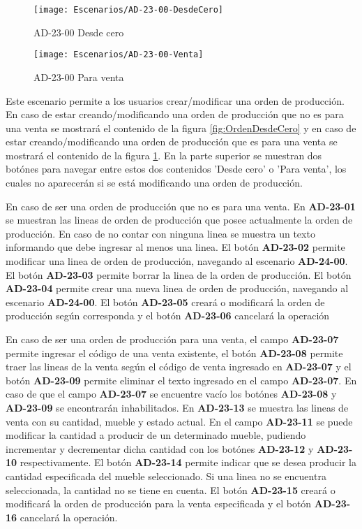 \begin{figure}[H]
    \centering
    \begin{minipage}[b]{0.4\textwidth}
        \texttt{[image: Escenarios/AD-23-00-DesdeCero]}
        \caption{AD-23-00 Desde cero}
        \label{fig:OrdenDesdeCero}
    \end{minipage}
    \hfill
    \begin{minipage}[b]{0.4\textwidth}
        \texttt{[image: Escenarios/AD-23-00-Venta]}
        \caption{AD-23-00 Para venta}
        \label{fig:OrdenParaVenta}
    \end{minipage}
    \end{figure}

Este escenario permite a los usuarios crear/modificar una orden de producción. En caso de estar creando/modificando una orden de producción que no es para una venta se mostrará el contenido de la figura \ref{fig:OrdenDesdeCero} y en caso de estar creando/modificando una orden de producción que es para una venta se mostrará el contenido de la figura \ref{fig:OrdenParaVenta}. En la parte superior se muestran dos botónes para navegar entre estos dos contenidos 'Desde cero' o 'Para venta', los cuales no aparecerán si se está modificando una orden de producción. 

En caso de ser una orden de producción que no es para una venta. En \textbf{AD-23-01} se muestran las lineas de orden de producción que posee actualmente la orden de producción. En caso de no contar con ninguna linea se muestra un texto informando que debe ingresar al menos una linea. El botón \textbf{AD-23-02} permite modificar una linea de orden de producción, navegando al escenario \textbf{AD-24-00}. El botón \textbf{AD-23-03} permite borrar la linea de la orden de producción. El botón \textbf{AD-23-04} permite crear una nueva linea de orden de producción, navegando al escenario \textbf{AD-24-00}. El botón \textbf{AD-23-05} creará o modificará la orden de producción según corresponda y el botón \textbf{AD-23-06} cancelará la operación

En caso de ser una orden de producción para una venta, el campo \textbf{AD-23-07} permite ingresar el código de una venta existente, el botón \textbf{AD-23-08} permite traer las lineas de la venta según el código de venta ingresado en \textbf{AD-23-07} y el botón \textbf{AD-23-09} permite eliminar el texto ingresado en el campo \textbf{AD-23-07}. En caso de que el campo \textbf{AD-23-07} se encuentre vacío los botónes \textbf{AD-23-08} y \textbf{AD-23-09} se encontrarán inhabilitados. 
En \textbf{AD-23-13} se muestra las lineas de venta con su cantidad, mueble y estado actual. En el campo \textbf{AD-23-11} se puede modificar la cantidad a producir de un determinado mueble, pudiendo incrementar y decrementar dicha cantidad con los botónes \textbf{AD-23-12} y \textbf{AD-23-10} respectivamente. El botón \textbf{AD-23-14} permite indicar que se desea producir la cantidad especificada del mueble seleccionado. Si una linea no se encuentra seleccionada, la cantidad no se tiene en cuenta.
El botón \textbf{AD-23-15} creará o modificará la orden de producción para la venta especificada y el botón \textbf{AD-23-16} cancelará la operación.
\clearpage
